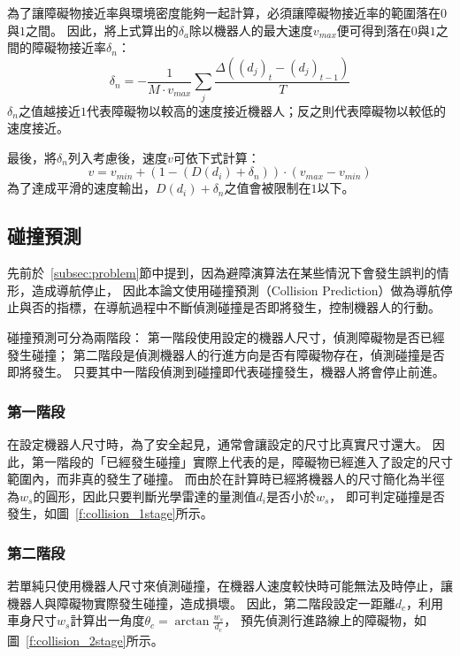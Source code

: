 為了讓障礙物接近率與環境密度能夠一起計算，必須讓障礙物接近率的範圍落在$0$與$1$之間。
因此，將上式算出的$\delta_a$除以機器人的最大速度$v_{max}$便可得到落在$0$與$1$之間的障礙物接近率$\delta_n$：
\begin{equation}
	\delta_n = -\frac{1}{M \cdot v_{max}}\sum_{j}\frac{\Delta((d_j)_t - (d_j)_{t-1})}{T}
\end{equation}
$\delta_n$之值越接近$1$代表障礙物以較高的速度接近機器人；反之則代表障礙物以較低的速度接近。

最後，將$\delta_n$列入考慮後，速度$v$可依下式計算：
\begin{equation}
	v = v_{min} + (1-(D(d_i)+\delta_n)) \cdot (v_{max} - v_{min})
	\label{e:speed_control}
\end{equation}
為了達成平滑的速度輸出，$D(d_i) + \delta_n$之值會被限制在$1$以下。

\subsection{碰撞預測}
先前於~\ref{subsec:problem}節中提到，因為避障演算法在某些情況下會發生誤判的情形，造成導航停止，
因此本論文使用碰撞預測（Collision Prediction）做為導航停止與否的指標，在導航過程中不斷偵測碰撞是否即將發生，控制機器人的行動。

碰撞預測可分為兩階段：
第一階段使用設定的機器人尺寸，偵測障礙物是否已經發生碰撞；
第二階段是偵測機器人的行進方向是否有障礙物存在，偵測碰撞是否即將發生。
只要其中一階段偵測到碰撞即代表碰撞發生，機器人將會停止前進。

\subsubsection{第一階段}
在設定機器人尺寸時，為了安全起見，通常會讓設定的尺寸比真實尺寸還大。
因此，第一階段的「已經發生碰撞」實際上代表的是，障礙物已經進入了設定的尺寸範圍內，而非真的發生了碰撞。
而由於在計算時已經將機器人的尺寸簡化為半徑為$w_s$的圓形，因此只要判斷光學雷達的量測值$d_i$是否小於$w_s$，
即可判定碰撞是否發生，如圖~\ref{f:collision_1stage}所示。

\subsubsection{第二階段}
若單純只使用機器人尺寸來偵測碰撞，在機器人速度較快時可能無法及時停止，讓機器人與障礙物實際發生碰撞，造成損壞。
因此，第二階段設定一距離$d_c$，利用車身尺寸$w_s$計算出一角度$\theta_c = \arctan{\frac{w_s}{d_c}}$，
預先偵測行進路線上的障礙物，如圖~\ref{f:collision_2stage}所示。

